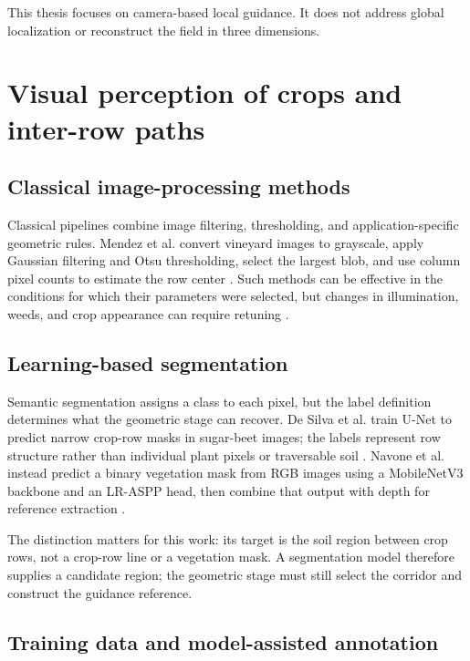 This thesis focuses on camera-based local guidance. It does not address
global localization or reconstruct the field in three dimensions.

\section{Visual perception of crops and inter-row paths}
\label{sec:percezione_sentiero}

\subsection{Classical image-processing methods}
\label{subsec:metodi_classici_colore}

Classical pipelines combine image filtering, thresholding, and
application-specific geometric rules. Mendez et al. convert vineyard
images to grayscale, apply Gaussian filtering and Otsu thresholding,
select the largest blob, and use column pixel counts to estimate the row
center \cite[Sections~3.4--4]{mendez2023vineyards}. Such methods can be
effective in the conditions for which their parameters were selected,
but changes in illumination, weeds, and crop appearance can require
retuning \cite[Section~2]{kneip2020cropedge}.

\subsection{Learning-based segmentation}
\label{subsec:deep_learning_segmentazione}

Semantic segmentation assigns a class to each pixel, but the label
definition determines what the geometric stage can recover. De Silva
et al. train U-Net to predict narrow crop-row masks in sugar-beet
images; the labels represent row structure rather than individual plant
pixels or traversable soil \cite[Sections~3.3 and~4.1]{silva2023rowdetection}.
Navone et al. instead predict a binary vegetation mask from RGB images
using a MobileNetV3 backbone and an LR-ASPP head, then combine that
output with depth for reference extraction
\cite[Sections~3.3 and~4.1]{navone2025gpsfree}.

The distinction matters for this work: its target is the soil region
between crop rows, not a crop-row line or a vegetation mask. A
segmentation model therefore supplies a candidate region; the geometric
stage must still select the corridor and construct the guidance
reference.

\subsection{Training data and model-assisted annotation}
\label{sec:dataset_transfer}

